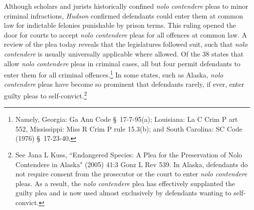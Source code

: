 Although scholars and jurists historically confined \textit{nolo contendere} pleas to minor criminal infractions, \textit{Hudson} confirmed defendants could enter them at common law for indictable felonies punishable by prison terms. This ruling opened the door for courts to accept \textit{nolo contendere} pleas for all offences at common law. A review of the plea today reveals that the legislatures followed suit, such that \textit{nolo contendere} is usually universally applicable where allowed. Of the 38 states that allow \textit{nolo contendere} pleas in criminal cases, all but four permit defendants to enter them for all criminal offences.\footnote{Namely, Georgia: Ga Ann Code § 17-7-95(a); Louisiana: La C Crim P art 552, Mississippi: Miss R Crim P rule 15.3(b); and South Carolina: SC Code (1976) § 17-23-40.} In some states, such as Alaska, \textit{nolo contendere} pleas have become so prominent that defendants rarely, if ever, enter guilty pleas to self-convict.\footnote{See Jana L Kuss, ``Endangered Species: A Plea for the Preservation of Nolo Contendere in
Alaska" (2005) 41:3 Gonz L Rev 539. In Alaska, defendants do not require consent from the prosecutor or the court to enter \textit{nolo contendere} pleas. As a result, the \textit{nolo contendere} plea has effectively supplanted the guilty plea and is now used almost exclusively by defendants wanting to self-convict.}

